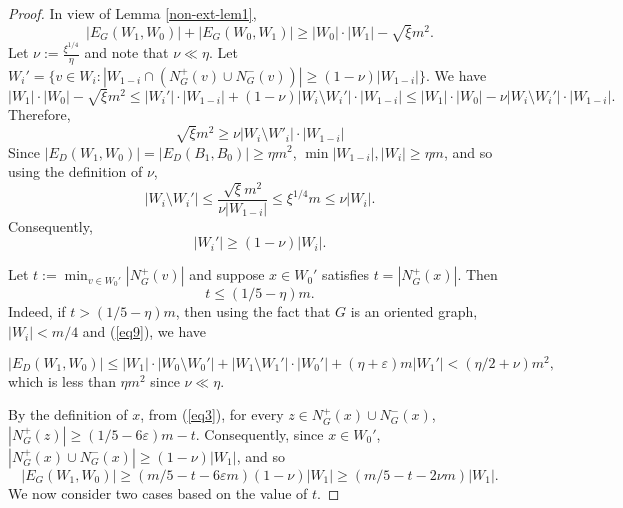 \documentclass{article}
\renewcommand{\epsilon}{{\varepsilon}}
\begin{document}
\begin{proof}
In view of Lemma \ref{non-ext-lem1},
$$|E_G(W_1, W_0)|+|E_G(W_0,W_1)|\geq |W_0|\cdot |W_1|- \sqrt{\xi} m^2.$$
Let $\nu:=\frac{\xi^{1/4}}{\eta}$ and note that $\nu \ll \eta$. Let $W_i'= \{v\in W_i: |W_{1-i} \cap (N^+_G(v)\cup N^-_G(v))| \geq (1-\nu)|W_{1-i}|\}.$
We have
$$|W_1|\cdot |W_0| -\sqrt{\xi} m^2\leq |W_i'|\cdot |W_{1-i}|+ (1-\nu)|W_i\setminus W_i'|\cdot |W_{1-i}|\leq |W_1|\cdot |W_0|-\nu |W_i\setminus W_i'|\cdot |W_{1-i}|.$$
Therefore, \[
    \sqrt{\xi}m^2 \geq \nu|W_i \setminus W'_i|\cdot |W_{1 - i}|
\]
Since $|E_D(W_1,W_0)|=|E_D(B_1, B_0)|\geq \eta m^2$, $\min{|W_{1-i}|, |W_i|}\geq \eta m$, and so using the definition of $\nu$,
\begin{equation}\label{eq9}
|W_i\setminus W_i'|\leq \frac{\sqrt{\xi}m^2}{\nu |W_{1-i}|}\leq \xi^{1/4}m\leq \nu |W_i|.\end{equation}
Consequently,
$$|W_i'|\geq (1-\nu)|W_i|.$$

Let $t:= \min_{v\in W_0'}|N^+_{G}(v)|$ and suppose $x\in W_0'$  satisfies $t= |N^+_{G}(x)|.$ 
Then 
\begin{equation}\label{eq-ne-t}
    t\leq (1/5-\eta)m.
\end{equation}
Indeed, if $t>(1/5-\eta)m$, then using the fact that $G$ is an oriented graph, $|W_i|< m/4$ and (\ref{eq9}), we have

$$|E_D(W_1, W_0)|\leq |W_1|\cdot|W_0\setminus W_0'|+|W_1\setminus W_1'|\cdot |W_0'|+ (\eta+\epsilon)m|W_1'|< (\eta/2 +\nu)m^2,$$
which is less than $\eta m^2$ since $\nu \ll \eta$. 

By the definition of $x$, from (\ref{eq3}), for every $z\in N^+_{G}(x)\cup N^-_{G}(x)$,  $|N^+_{G}(z)|\geq (1/5-6\epsilon)m- t.$ 
Consequently, since $x\in W_0'$, $|N^+_{G}(x)\cup N^-_{G}(x)|\geq (1-\nu)|W_1|$, and so
\begin{equation}\label{eq-E_G}
    |E_{G}(W_1, W_0)|\geq (m/5-t -6\epsilon m)(1-\nu)|W_1|\geq (m/5- t-2\nu m)|W_1|.
\end{equation}
We now consider two cases based on the value of $t$.


\end{proof}
\end{document}
